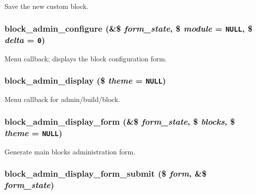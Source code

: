 Save the new custom block. \hypertarget{block_8admin_8inc_372fcc9d5969bca36bb69c05608a8767}{
\subsubsection[{block\_\-admin\_\-configure}]{\setlength{\rightskip}{0pt plus 5cm}block\_\-admin\_\-configure (\&\$ {\em form\_\-state}, \/  \$ {\em module} = {\tt NULL}, \/  \$ {\em delta} = {\tt 0})}}
\label{block_8admin_8inc_372fcc9d5969bca36bb69c05608a8767}


Menu callback; displays the block configuration form. \hypertarget{block_8admin_8inc_46d186397b98e4faf46681f7f9cd86a1}{
\subsubsection[{block\_\-admin\_\-display}]{\setlength{\rightskip}{0pt plus 5cm}block\_\-admin\_\-display (\$ {\em theme} = {\tt NULL})}}
\label{block_8admin_8inc_46d186397b98e4faf46681f7f9cd86a1}


Menu callback for admin/build/block. \hypertarget{block_8admin_8inc_576161bbf4ada256c05756fd9b2a7b07}{
\subsubsection[{block\_\-admin\_\-display\_\-form}]{\setlength{\rightskip}{0pt plus 5cm}block\_\-admin\_\-display\_\-form (\&\$ {\em form\_\-state}, \/  \$ {\em blocks}, \/  \$ {\em theme} = {\tt NULL})}}
\label{block_8admin_8inc_576161bbf4ada256c05756fd9b2a7b07}


Generate main blocks administration form. \hypertarget{block_8admin_8inc_9a7a5d16e2db34422f490e08d4bda247}{
\subsubsection[{block\_\-admin\_\-display\_\-form\_\-submit}]{\setlength{\rightskip}{0pt plus 5cm}block\_\-admin\_\-display\_\-form\_\-submit (\$ {\em form}, \/  \&\$ {\em form\_\-state})}}
\label{block_8admin_8inc_9a7a5d16e2db34422f490e08d4bda247}


